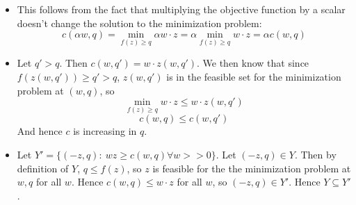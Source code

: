 \documentclass[10pt,letter]{article}
\begin{document}
\begin{itemize}
\item This follows from the fact that multiplying the objective function by a scalar doesn't change the solution to the minimization problem:
\[ c(\alpha w, q) = \min_{f(z) \ge q} \alpha w \cdot z =  \alpha \min_{f(z) \ge q}  w \cdot z = \alpha c(w, q) \]
\item Let $q' > q$. Then $c(w, q') = w \cdot z(w, q')$. We then know that since $f(z(w, q')) \ge q' > q$, $z(w,q')$ is in the feasible set for the minimization problem at $(w, q)$, so
\[\min_{f(z) \ge q}  w \cdot z \le w \cdot z(w, q') \]
\[ c(w, q) \le c(w, q') \]
And hence $c$ is increasing in $q$.
\item Let $Y' = \{ (-z, q) : \ wz \ge c(w,q) \forall w >> 0 \}$. Let $(-z, q) \in Y$. Then by definition of $Y$, $q \le f(z)$, so $z$ is feasible for the the minimization problem at $w,q$ for all $w$. Hence $c(w, q) \le w \cdot z$ for all $w$, so $(-z, q) \in Y'$. Hence $Y \subseteq Y'$.


\end{itemize}
\end{document}
